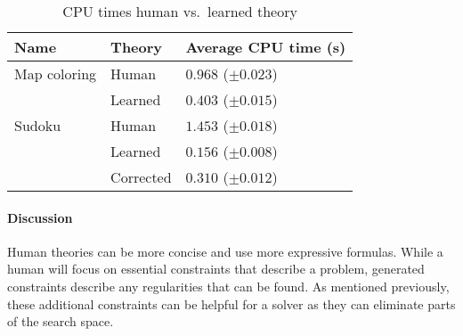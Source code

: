 \begin{experiment}[\textsc{Speed}]


	\begin{table}[!htp]
		\begin{tabularx}{\textwidth}{XX|X}
			\textbf{Name} & \textbf{Theory} & \textbf{Average CPU time (s)} \\
			\toprule
			Map coloring & Human & $0.968$ 	($\pm 0.023$) \\
			& Learned & $0.403$ 			($\pm 0.015$) \\
			\midrule
			Sudoku & Human & $1.453$ 		($\pm 0.018$) \\ 
			& Learned & $0.156$ 			($\pm 0.008$) \\
			& Corrected & $0.310$ 			($\pm 0.012$)
		\end{tabularx}
		\caption{CPU times human vs.~learned theory}
		\label{tbl:speed_human_machine}
	\end{table}

\end{experiment}

\paragraph{Discussion}
Human theories can be more concise and use more expressive formulas.
While a human will focus on essential constraints that describe a problem, generated constraints describe any regularities that can be found.
As mentioned previously, these additional constraints can be helpful for a solver as they can eliminate parts of the search space.

